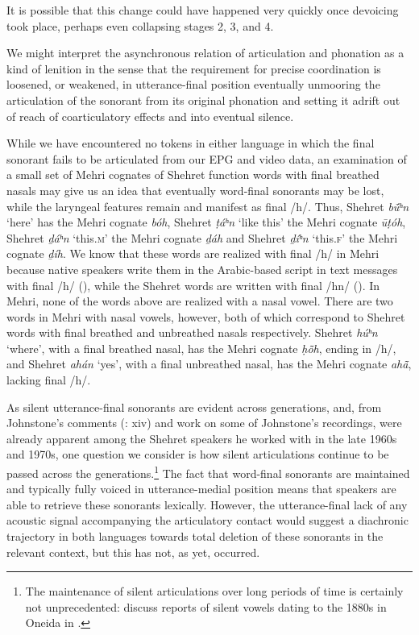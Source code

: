\documentclass[output=paper]{langscibook}
\begin{document}
It is possible that this change could have happened very quickly once devoicing took place, perhaps even collapsing stages 2, 3, and 4.

We might interpret the asynchronous relation of articulation and phonation as a kind of lenition in the sense that the requirement for precise coordination is loosened, or weakened, in utterance-final position eventually unmooring the articulation of the sonorant from its original phonation and setting it adrift out of reach of coarticulatory effects and into eventual silence.

While we have encountered no tokens in either language in which the final sonorant fails to be articulated from our EPG and video data, an examination of a small set of Mehri cognates of Shehret function words with final breathed nasals may give us an idea that eventually word-final sonorants may be lost, while the laryngeal features remain and manifest as final \mbox{/h/}. Thus, Shehret \textit{b\'{ū}ʰn} ‘here’ has the Mehri cognate \textit{bóh}, Shehret \textit{ṭáʰn} ‘like this’ the Mehri cognate \textit{ūṭóh}, Shehret \textit{ḏáʰn} ‘this.\textsc{m}’ the Mehri cognate \textit{ḏáh} and Shehret \textit{ḏíʰn} ‘this.\textsc{f}’ the Mehri cognate \textit{ḏíh}. We know that these words are realized with final \mbox{/h/} in Mehri because native speakers write them in the Arabic-based script in text messages with final \mbox{/h/} ({}), while the Shehret words are written with final \mbox{/hn/} ({}). In Mehri, none of the words above are realized with a nasal vowel. There are two words in Mehri with nasal vowels, however, both of which correspond to Shehret words with final breathed and unbreathed nasals respectively. Shehret \textit{húʰn} ‘where’, with a final breathed nasal, has the Mehri cognate \textit{ḥ\~{ō}h}, ending in \mbox{/h/}, and Shehret \textit{ahán} ‘yes’, with a final unbreathed nasal, has the Mehri cognate \textit{ah\~{ā}}, lacking final \mbox{/h/}.

As silent utterance-final sonorants are evident across generations, and, from Johnstone’s comments (\cite*{Johnstone1981}: xiv) and  work on some of Johnstone’s recordings, were already apparent among the Shehret speakers he worked with in the late 1960s and 1970s, one question we consider is how silent articulations continue to be passed across the generations.\footnote{\textrm{The maintenance of silent articulations over long periods of time is certainly not unprecedented: \citet{GickEtAl2012} discuss reports of silent vowels dating to the 1880s in Oneida in \citet{Cooper1885}.}} The fact that word-final sonorants are maintained and typically fully voiced in utterance-medial position means that speakers are able to retrieve these sonorants lexically. However, the utterance-final lack of any acoustic signal accompanying the articulatory contact would suggest a diachronic trajectory in both languages towards total deletion of these sonorants in the relevant context, but this has not, as yet, occurred.
\end{document}
